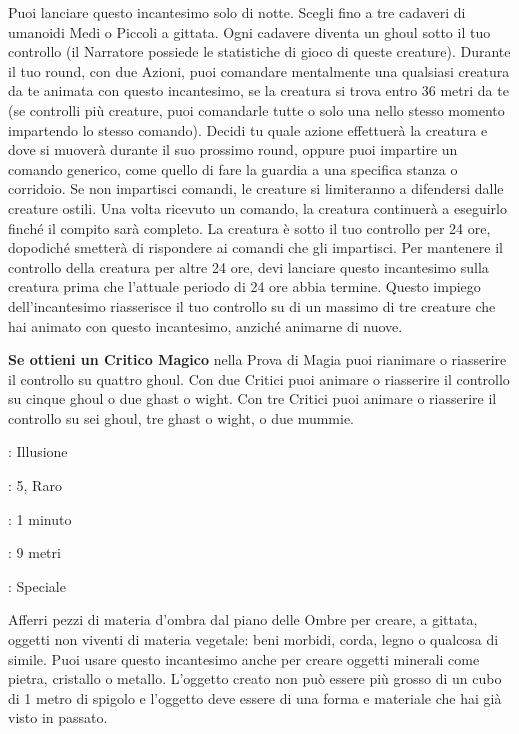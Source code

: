\begin{multicols}{2}
Puoi lanciare questo incantesimo solo di notte. Scegli fino a tre cadaveri di umanoidi Medi o Piccoli a gittata. Ogni cadavere diventa un ghoul sotto il tuo controllo (il Narratore possiede le statistiche di gioco di queste creature). Durante il tuo round, con due Azioni, puoi comandare mentalmente una qualsiasi creatura da te animata con questo incantesimo, se la creatura si trova entro 36 metri da te (se controlli più creature, puoi comandarle tutte o solo una nello stesso momento impartendo lo stesso comando). Decidi tu quale azione effettuerà la creatura e dove si muoverà durante il suo prossimo round, oppure puoi impartire un comando generico, come quello di fare la guardia a una specifica stanza o corridoio. Se non impartisci comandi, le creature si limiteranno a difendersi dalle creature ostili. Una volta ricevuto un comando, la creatura continuerà a eseguirlo finché il compito sarà completo. La creatura è sotto il tuo controllo per 24 ore, dopodiché smetterà di rispondere ai comandi che gli impartisci. Per mantenere il controllo della creatura per altre 24 ore, devi lanciare questo incantesimo sulla creatura prima che l'attuale periodo di 24 ore abbia termine. Questo impiego dell'incantesimo riasserisce il tuo controllo su di un massimo di tre creature che hai animato con questo incantesimo, anziché animarne di nuove.

\textbf{Se ottieni un Critico Magico} nella Prova di Magia puoi rianimare o riasserire il controllo su quattro ghoul. Con due Critici puoi animare o riasserire il controllo su cinque ghoul o due ghast o wight. Con tre Critici puoi animare o riasserire il controllo su sei ghoul, tre ghast o wight, o due mummie.

\noindent\colorbox{OBSSgold!10}{
\begin{minipage}{0.95\linewidth}
\begin{description}[noitemsep, topsep=0pt, parsep=0pt, partopsep=0pt, leftmargin=0cm, labelwidth=1.3cm]
	\item[\textbf{Lista}]: Illusione
	\item[\textbf{Livello}]: 5, Raro
	\item[\textbf{Lancio}]: 1 minuto
	\item[\textbf{Gittata}]: 9 metri
	\item[\textbf{Durata}]: Speciale
\end{description}
\end{minipage}}\smallskip

Afferri pezzi di materia d'ombra dal piano delle Ombre per creare, a gittata, oggetti non viventi di materia vegetale: beni morbidi, corda, legno o qualcosa di simile. Puoi usare questo incantesimo anche per creare oggetti minerali come pietra, cristallo o metallo. L'oggetto creato non può essere più grosso di un cubo di 1 metro di spigolo e l'oggetto deve essere di una forma e materiale che hai già visto in passato.


\end{multicols}
